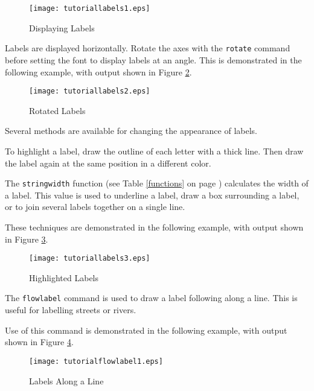 

\begin{figure}[htb]
\texttt{[image: tutoriallabels1.eps]}
\caption{Displaying Labels}
\label{tutoriallabels1}
\end{figure}

Labels are displayed horizontally.  Rotate the axes with the \texttt{rotate}
command before setting the font to display labels at an angle.
This is demonstrated in the following example,
with output shown in Figure \ref{tutoriallabels2}.



\begin{figure}[htb]
\texttt{[image: tutoriallabels2.eps]}
\caption{Rotated Labels}
\label{tutoriallabels2}
\end{figure}

Several methods are available for changing the appearance of labels.

To highlight a label, draw the outline of each letter with a thick line.
Then draw the label again at the same position in a different color.

The \texttt{stringwidth} function (see Table \ref{functions}
on page \pageref{functions}) calculates the
width of a label.  This value is used to underline a label, draw a box
surrounding a label, or to join several labels together on a single line.

These techniques are demonstrated in the following example,
with output shown in Figure \ref{tutoriallabels3}.



\begin{figure}[htb]
\texttt{[image: tutoriallabels3.eps]}
\caption{Highlighted Labels}
\label{tutoriallabels3}
\end{figure}

The \texttt{flowlabel} command is used to draw a label
following along a line.  This is useful for labelling streets or
rivers.

Use of this command is demonstrated in the following example,
with output shown in Figure \ref{tutoriallabels4}.



\begin{figure}[htb]
\texttt{[image: tutorialflowlabel1.eps]}
\caption{Labels Along a Line}
\label{tutoriallabels4}
\end{figure}

